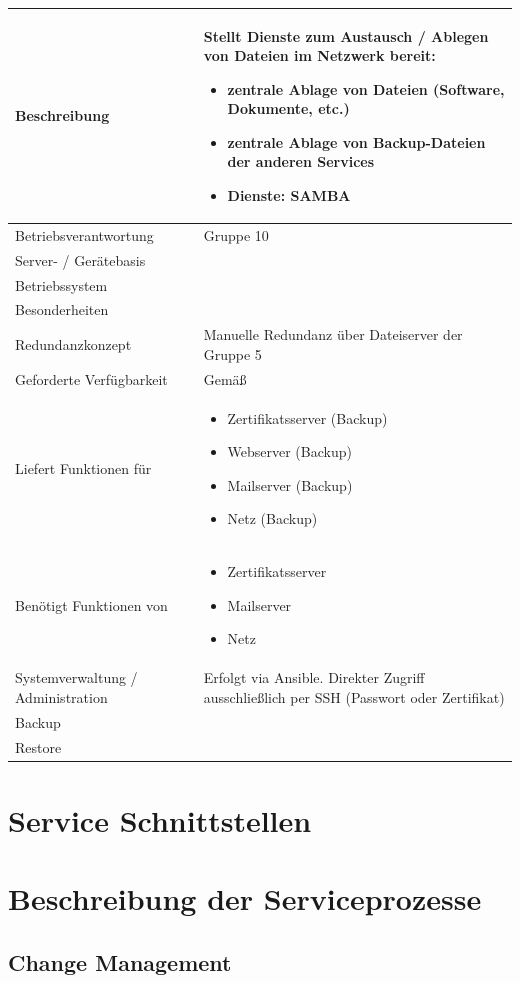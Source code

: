 \documentclass[]{article}
\begin{document}
\begin{longtable}{|l|p{6cm}|}
\toprule
Beschreibung & Stellt Dienste zum Austausch / Ablegen von Dateien im
Netzwerk bereit:

\begin{itemize}
\item
  zentrale Ablage von Dateien (Software, Dokumente, etc.)
\item
  zentrale Ablage von Backup-Dateien der anderen Services
\item
  Dienste: SAMBA
\end{itemize}\tabularnewline
\midrule
Betriebsverantwortung & Gruppe 10\tabularnewline
Server- / Gerätebasis &\tabularnewline
Betriebssystem &\tabularnewline
Besonderheiten &\tabularnewline
Redundanzkonzept & Manuelle Redundanz über Dateiserver der Gruppe
5\tabularnewline
Geforderte Verfügbarkeit & Gemäß\tabularnewline
Liefert Funktionen für & \begin{itemize}
\item
  Zertifikatsserver (Backup)
\item
  Webserver (Backup)
\item
  Mailserver (Backup)
\item
  Netz (Backup)
\end{itemize}\tabularnewline
Benötigt Funktionen von & \begin{itemize}
\item
  Zertifikatsserver
\item
  Mailserver
\item
  Netz
\end{itemize}\tabularnewline
Systemverwaltung / Administration & Erfolgt via Ansible. Direkter Zugriff ausschließlich per SSH (Passwort oder Zertifikat)\tabularnewline
Backup &\tabularnewline
Restore &\tabularnewline
\bottomrule
\end{longtable}

\newpage

\section{Service Schnittstellen}\label{service-schnittstellen}

\section{Beschreibung der
Serviceprozesse}\label{beschreibung-der-serviceprozesse}

\subsection{Change Management}\label{change-management}
\end{document}
